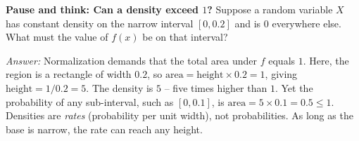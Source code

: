 \begin{walkbox}
\textbf{Pause and think: Can a density exceed $1$?} Suppose a random variable
$X$ has constant density on the narrow interval $[0, 0.2]$ and is $0$
everywhere else. What must the value of $f(x)$ be on that interval?

\emph{Answer:} Normalization demands that the total area under $f$ equals $1$.
Here, the region is a rectangle of width $0.2$, so $\text{area} = \text{height}
\times 0.2 = 1$, giving $\text{height} = 1/0.2 = 5$. The density is $5$ -- five
times higher than $1$. Yet the probability of any sub-interval, such as
$[0, 0.1]$, is $\text{area} = 5 \times 0.1 = 0.5 \le 1$. Densities are
\emph{rates} (probability per unit width), not probabilities. As long as the
base is narrow, the rate can reach any height.
\end{walkbox}

